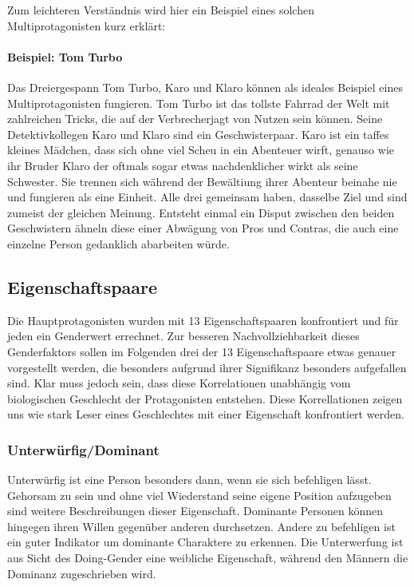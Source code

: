 

Zum leichteren Verständnis wird hier ein Beispiel eines solchen
Multiprotagonisten kurz erklärt:

\paragraph{Beispiel: Tom Turbo}

Das Dreiergespann Tom Turbo, Karo und Klaro können als ideales Beispiel
eines Multiprotagonisten fungieren. Tom Turbo ist das tollste Fahrrad
der Welt mit zahlreichen Tricks, die auf der Verbrecherjagt von Nutzen
sein können. Seine Detektivkollegen Karo und Klaro sind ein
Geschwisterpaar. Karo ist ein taffes kleines Mädchen, dass sich ohne
viel Scheu in ein Abenteuer wirft, genauso wie ihr Bruder Klaro der
oftmals sogar etwas nachdenklicher wirkt als seine Schwester. Sie
trennen sich während der Bewältiung ihrer Abenteur beinahe nie und
fungieren als eine Einheit. Alle drei gemeinsam haben, dasselbe Ziel und
sind zumeist der gleichen Meinung. Entsteht einmal ein Disput zwischen
den beiden Geschwistern ähneln diese einer Abwägung von Pros und
Contras, die auch eine einzelne Person gedanklich abarbeiten würde.
\parencite{brezina2000}

\subsection{Eigenschaftspaare}

Die Hauptprotagonisten wurden mit 13 Eigenschaftspaaren konfrontiert und
für jeden ein Genderwert errechnet. Zur besseren Nachvollziehbarkeit
dieses Genderfaktors sollen im Folgenden drei der 13 Eigenschaftspaare
etwas genauer vorgestellt werden, die besonders aufgrund ihrer
Signifikanz besonders aufgefallen sind. Klar muss jedoch sein, dass
diese Korrelationen unabhängig vom biologischen Geschlecht der
Protagonisten entstehen. Diese Korrellationen zeigen uns wie stark Leser
eines Geschlechtes mit einer Eigenschaft konfrontiert werden.



\subsubsection{Unterwürfig/Dominant}

Unterwürfig ist eine Person besonders dann, wenn sie sich befehligen
lässt. Gehorsam zu sein und ohne viel Wiederstand seine eigene Position
aufzugeben sind weitere Beschreibungen dieser Eigenschaft. Dominante
Personen können hingegen ihren Willen gegenüber anderen durchsetzen.
Andere zu befehligen ist ein guter Indikator um dominante Charaktere zu
erkennen. Die Unterwerfung ist aus Sicht des Doing-Gender eine weibliche
Eigenschaft, während den Männern die Dominanz zugeschrieben wird.

